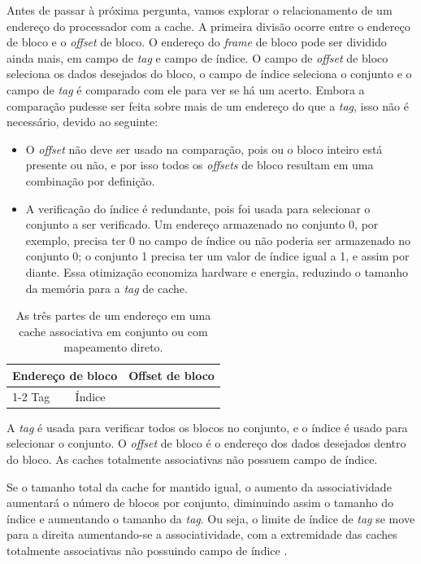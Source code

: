 Antes de passar à próxima pergunta, vamos explorar o relacionamento de um endereço do processador com a cache. A primeira divisão ocorre entre o endereço de bloco e o \textit{offset} de bloco. O endereço do \textit{frame} de bloco pode ser dividido ainda mais, em campo de \textit{tag} e campo de índice. O campo de \textit{offset} de bloco seleciona os dados desejados do bloco, o campo de índice seleciona o conjunto e o campo de \textit{tag} é comparado com ele para ver se há um acerto. Embora a comparação pudesse ser feita sobre mais de um endereço do que a \textit{tag}, isso não é necessário, devido ao seguinte:
\begin{itemize}
    \item O \textit{offset} não deve ser usado na comparação, pois ou o bloco inteiro está presente ou não, e por isso todos os \textit{offsets} de bloco resultam em uma combinação por definição.
    \item A verificação do índice é redundante, pois foi usada para selecionar o conjunto a ser verificado. Um endereço armazenado no conjunto 0, por exemplo, precisa ter 0 no campo de índice ou não poderia ser armazenado no conjunto 0; o conjunto 1 precisa ter um valor de índice igual a 1, e assim por diante. Essa otimização economiza hardware e energia, reduzindo o tamanho da memória para a \textit{tag} de cache.
\end{itemize}

\begin{table}[H]
    \centering
    \begin{tabular}{|l|l|l|}
        \hline
        \multicolumn{2}{|c|}{Endereço de bloco} & \multirow{2}{*}{Offset de bloco} \\ \cline{1-2}
        Tag & Índice & \\ \hline
    \end{tabular}
    \caption{As três partes de um endereço em uma cache associativa em conjunto ou com mapeamento direto.}
    \label{tab:endereco}
\end{table}

A \textit{tag} é usada para verificar todos os blocos no conjunto, e o índice é usado para selecionar o conjunto. O \textit{offset} de bloco é o endereço dos dados desejados dentro do bloco. As caches totalmente associativas não possuem campo de índice.

Se o tamanho total da cache for mantido igual, o aumento da associatividade aumentará o número de blocos por conjunto, diminuindo assim o tamanho do índice e aumentando o tamanho da \textit{tag}. Ou seja, o limite de índice de \textit{tag} se move para a direita aumentando-se a associatividade, com a extremidade das caches totalmente associativas não possuindo campo de índice \cite{hennessy2019}.

